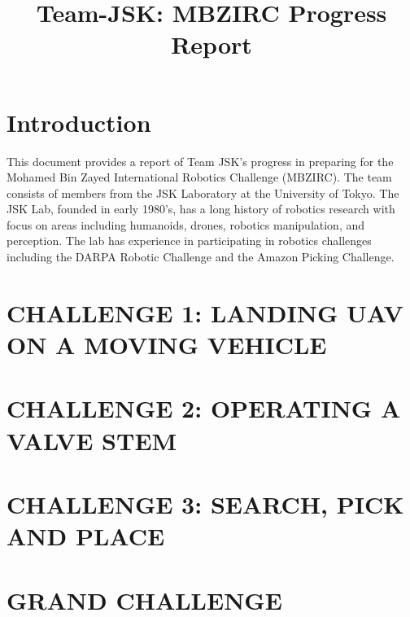 \documentclass[letterpaper, 10 pt, conference]{ieeeconf}  %
\title{\LARGE \bf
  Team-JSK: MBZIRC Progress Report
}
\begin{document}
\maketitle
\thispagestyle{empty}
\pagestyle{empty}


\section{Introduction}
This document provides a report of Team JSK’s progress in preparing for the Mohamed Bin Zayed International Robotics Challenge (MBZIRC). The team consists of members from the JSK Laboratory at the University of Tokyo. The JSK Lab, founded in early 1980’s, has a long history of robotics research with focus on areas including humanoids, drones, robotics manipulation, and perception. The lab has experience in participating in robotics challenges including the DARPA Robotic Challenge and the Amazon Picking Challenge.



\section{CHALLENGE 1: LANDING UAV ON A MOVING VEHICLE}



\section{CHALLENGE 2: OPERATING A VALVE STEM}

\section{CHALLENGE 3: SEARCH, PICK AND PLACE}

\section{GRAND CHALLENGE}


\end{document}
